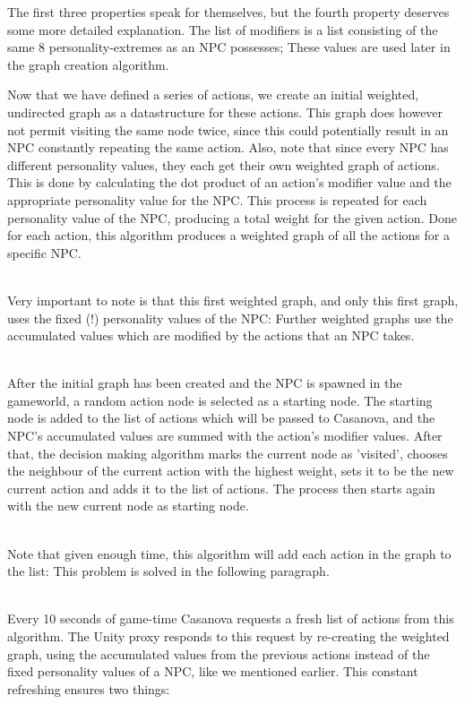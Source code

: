 \documentclass[11pt]{article} %
\begin{document}
The first three properties speak for themselves, but the fourth property deserves some more detailed explanation. The list of modifiers is a list consisting of the same 8 personality-extremes as an NPC possesses; These values are used later in the graph creation algorithm.

\newpage
Now that we have defined a series of actions, we create an initial weighted, undirected graph as a datastructure for these actions. This graph does however not permit visiting the same node twice, since this could potentially result in an NPC constantly repeating the same action. Also,  note that since every NPC has different personality values, they each get their own weighted graph of actions. This is done by calculating the dot product of an action's modifier value and the appropriate personality value for the NPC. This process is repeated for each personality value of the NPC, producing a total weight for the given action. Done for each action, this algorithm produces a weighted graph of all the actions for a specific NPC.

~\\
Very important to note is that this first weighted graph, and only this first graph, uses the fixed (!) personality values of the NPC: Further weighted graphs use the accumulated values which are modified by the actions that an NPC takes.

~\\
After the initial graph has been created and the NPC is spawned in the gameworld, a random action node is selected as a starting node. The starting node is added to the list of actions which will be passed to Casanova, and the NPC's accumulated values are summed with the action's modifier values. After that, the decision making algorithm marks the current node as 'visited', chooses the neighbour of the current action with the highest weight, sets it to be the new current action and adds it to the list of actions. The process then starts again with the new current node as starting node. 

~\\
Note that given enough time, this algorithm will add each action in the graph to the list: This problem is solved in the following paragraph.


~\\
Every 10 seconds of game-time Casanova requests a fresh list of actions from this algorithm. The Unity proxy responds to this request by re-creating the weighted graph, using the accumulated values from the previous actions instead of the fixed personality values of a NPC, like we mentioned earlier. This constant refreshing ensures two things: 
\end{document}
